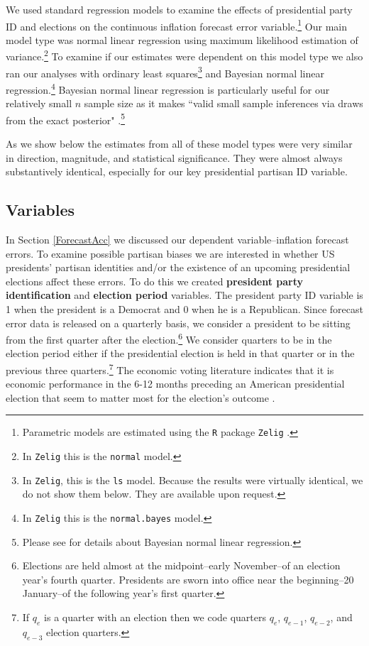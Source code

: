 \documentclass[a4paper]{article}
\begin{document}
We used standard regression models to examine the effects of presidential party ID and elections on the continuous inflation forecast error variable.\footnote{Parametric models are estimated using the \texttt{R} package \texttt{Zelig} \citep{Zelig2012}.} Our main model type was normal linear regression using maximum likelihood estimation of variance.\footnote{In {\tt{Zelig}} this is the {\tt{normal}} model.} To examine if our estimates were dependent on this model type we also ran our analyses with ordinary least squares\footnote{In \texttt{Zelig}, this is the \texttt{ls} model. Because the results were virtually identical, we do not show them below. They are available upon request.} and Bayesian normal linear regression.\footnote{In {\tt{Zelig}} this is the {\tt{normal.bayes}} model.} Bayesian normal linear regression is particularly useful for our relatively small $n$ sample size as it makes ``valid small sample inferences via draws from the exact posterior" \citep[][38]{Zelig2012}.\footnote{Please see \cite{Goodrich2007} for details about Bayesian normal linear regression.} 

As we show below the estimates from all of these model types were very similar in direction, magnitude, and statistical significance. They were almost always substantively identical, especially for our key presidential partisan ID variable. 

\subsection{Variables}

In Section \ref{ForecastAcc} we discussed our dependent variable--inflation forecast errors. To examine possible partisan biases we are interested in whether US presidents' partisan identities and/or the existence of an upcoming presidential elections affect these errors. To do this we created {\bf{president party identification}} and {\bf{election period}} variables. The president party ID variable is 1 when the president is a Democrat and 0 when he is a Republican. Since forecast error data is released on a quarterly basis, we consider a president to be sitting from the first quarter after the election.\footnote{Elections are held almost at the midpoint--early November--of an election year's fourth quarter. Presidents are sworn into office near the beginning--20 January--of the following year's first quarter.} We consider quarters to be in the election period either if the presidential election is held in that quarter or in the previous three quarters.\footnote{If $q_{e}$ is a quarter with an election then we code quarters $q_{e}$, $q_{e-1}$, $q_{e-2}$, and $q_{e-3}$ election quarters.} The economic voting literature indicates that it is economic performance in the 6-12 months preceding an American presidential election that seem to matter most for the election's outcome \citep[c.f][]{Gelman1993}. 
\end{document}
